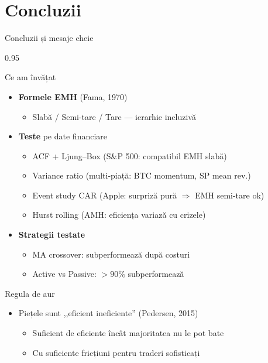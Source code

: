 \documentclass[9pt, aspectratio=169, t]{beamer}
\begin{document}
\section{Concluzii}

\begin{frame}[shrink=15]{Concluzii și mesaje cheie}
\begin{cminipage}{0.95\textwidth}
\begin{block}{Ce am învățat}
\begin{itemize}\setlength{\itemsep}{0pt}
    \item \textbf{Formele EMH} (Fama, 1970)
    \begin{itemize}\setlength{\itemsep}{0pt}
        \item Slabă / Semi-tare / Tare --- ierarhie incluzivă
    \end{itemize}
    \item \textbf{Teste} pe date financiare
    \begin{itemize}\setlength{\itemsep}{0pt}
        \item ACF + Ljung--Box (S\&P 500: compatibil EMH slabă)
        \item Variance ratio (multi-piață: BTC momentum, SP mean rev.)
        \item Event study CAR (Apple: surpriză pură $\Rightarrow$ EMH semi-tare ok)
        \item Hurst rolling (AMH: eficiența variază cu crizele)
    \end{itemize}
    \item \textbf{Strategii testate}
    \begin{itemize}\setlength{\itemsep}{0pt}
        \item MA crossover: subperformează după costuri
        \item Active vs Passive: $>90\%$ subperformează
    \end{itemize}
\end{itemize}
\end{block}

\begin{alertblock}{Regula de aur}
\begin{itemize}\setlength{\itemsep}{0pt}
    \item Piețele sunt ,,eficient ineficiente'' (Pedersen, 2015)
    \begin{itemize}\setlength{\itemsep}{0pt}
        \item Suficient de eficiente încât majoritatea nu le pot bate
        \item Cu suficiente fricțiuni pentru traderi sofisticați
    \end{itemize}
\end{itemize}
\end{alertblock}
\end{cminipage}
\end{frame}
\end{document}
